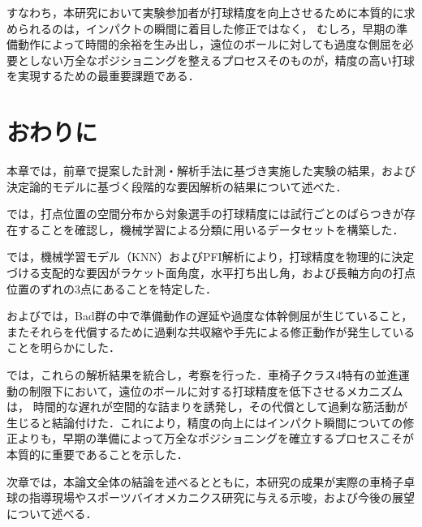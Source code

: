\documentclass[../main]{subfiles}
\begin{document}
すなわち，本研究において実験参加者が打球精度を向上させるために本質的に求められるのは，インパクトの瞬間に着目した修正ではなく，
むしろ，早期の準備動作によって時間的余裕を生み出し，遠位のボールに対しても過度な側屈を必要としない万全なポジショニングを整えるプロセスそのものが，精度の高い打球を実現するための最重要課題である．


\clearpage

\section{おわりに}
\label{sec:vexp_conclusion}

本章では，前章で提案した計測・解析手法に基づき実施した実験の結果，および決定論的モデルに基づく段階的な要因解析の結果について述べた．

では，打点位置の空間分布から対象選手の打球精度には試行ごとのばらつきが存在することを確認し，機械学習による分類に用いるデータセットを構築した．

では，機械学習モデル（KNN）およびPFI解析により，打球精度を物理的に決定づける支配的な要因がラケット面角度，水平打ち出し角，および長軸方向の打点位置のずれの3点にあることを特定した．

およびでは，Bad群の中で準備動作の遅延や過度な体幹側屈が生じていること，またそれらを代償するために過剰な共収縮や手先による修正動作が発生していることを明らかにした．

では，これらの解析結果を統合し，考察を行った．車椅子クラス4特有の並進運動の制限下において，遠位のボールに対する打球精度を低下させるメカニズムは，
時間的な遅れが空間的な詰まりを誘発し，その代償として過剰な筋活動が生じると結論付けた．これにより，精度の向上にはインパクト瞬間についての修正よりも，早期の準備によって万全なポジショニングを確立するプロセスこそが本質的に重要であることを示した．

次章では，本論文全体の結論を述べるとともに，本研究の成果が実際の車椅子卓球の指導現場やスポーツバイオメカニクス研究に与える示唆，および今後の展望について述べる．
\end{document}
